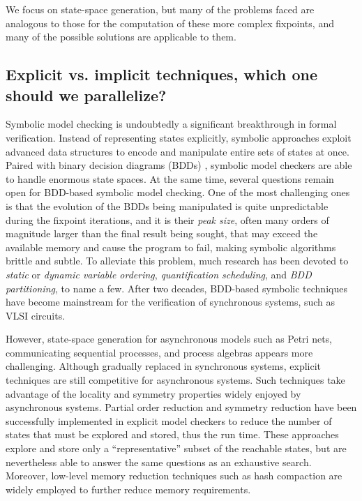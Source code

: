 \documentclass[copyright,creativecommons]{eptcs}
\begin{document}
We focus on state-space generation, but
many of the problems faced are analogous to those for the computation
of these more complex fixpoints, and many of the possible solutions
are applicable to them.


\subsection{Explicit vs. implicit techniques, which one should we parallelize?}

Symbolic model checking \cite{Burch1992} is undoubtedly a significant
breakthrough in formal verification.
Instead of representing states explicitly, symbolic approaches exploit advanced
data structures to encode and manipulate entire sets of states at once.
Paired with binary decision diagrams (BDDs) \cite{Bryant1986}, symbolic model
checkers are able to handle enormous state spaces.
At the same time, several questions remain open for BDD-based symbolic model
checking.
One of the most challenging ones is that the evolution of the BDDs being
manipulated is quite unpredictable during the fixpoint iterations, and it is
their \emph{peak size}, often many orders of
magnitude larger than the final result being sought,
that may exceed the available memory and cause the
program to fail, making symbolic algorithms brittle and subtle.
To alleviate this problem, much research has been devoted to \emph{static}
or \emph{dynamic variable ordering}, \emph{quantification scheduling},
and \emph{BDD partitioning}, to name a few.
After two decades, BDD-based symbolic techniques have become mainstream
for the verification of synchronous systems, such as VLSI circuits.

However, state-space generation for asynchronous models
such as Petri nets, communicating sequential processes, and
process algebras appears more challenging.
Although gradually replaced in synchronous systems,
explicit techniques are still competitive for asynchronous systems.
Such techniques take advantage of the locality and symmetry
properties widely enjoyed by asynchronous systems.
Partial order reduction \cite{Godefroid1996,Valmari1991CAV}
and symmetry reduction \cite{Chiola1991b}
have been successfully implemented
in explicit model checkers to reduce the number of states that must
be explored and stored, thus the run time.
These approaches explore
and store only a ``representative'' subset of the reachable states,
but are nevertheless able to answer the same questions as an
exhaustive search. Moreover, low-level memory reduction techniques
such as hash compaction are widely employed to further reduce memory
requirements.
\end{document}
